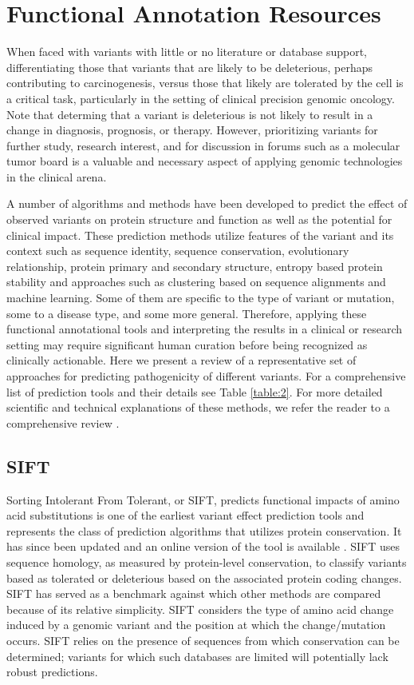 \documentclass{article}
\begin{document}
\section{Functional Annotation Resources}

When faced with variants with little or no literature or database
support, differentiating those that variants that are likely to be
deleterious, perhaps contributing to carcinogenesis, versus those that
likely are tolerated by the cell is a critical task, particularly in
the setting of clinical precision genomic oncology. Note that
determing that a variant is deleterious is not likely to result in a
change in diagnosis, prognosis, or therapy. However, prioritizing
variants for further study, research interest, and for discussion in
forums such as a molecular tumor board is a valuable and necessary
aspect of applying genomic technologies in the clinical arena.

A number of algorithms and methods have been developed to predict the
effect of observed variants on protein structure and function as well
as the potential for clinical impact. These prediction methods utilize
features of the variant and its context such as sequence identity,
sequence conservation, evolutionary relationship, protein primary and
secondary structure, entropy based protein stability and approaches
such as clustering based on sequence alignments and machine
learning. Some of them are specific to the type of variant or
mutation, some to a disease type, and some more general. Therefore,
applying these functional annotational tools and interpreting the
results in a clinical or research setting may require significant
human curation before being recognized as clinically actionable. Here
we present a review of a representative set of approaches for
predicting pathogenicity of different variants. For a comprehensive
list of prediction tools and their details see Table
\ref{table:2}. For more detailed scientific and technical explanations
of these methods, we refer the reader to a comprehensive review
\parencite{Addepalli2014-oa}.

\subsection{SIFT}

Sorting Intolerant From Tolerant, or SIFT, predicts functional impacts
of amino acid substitutions \parencite{Ng2003-vp} is one of the earliest
variant effect prediction tools and represents the class of prediction
algorithms that utilizes protein conservation. It has since been
updated and an online version of the tool is available
\parencite{Kumar2009-gd}. SIFT uses sequence homology, as measured by
protein-level conservation, to classify variants based as tolerated or
deleterious based on the associated protein coding changes. SIFT has
served as a benchmark against which other methods are compared because
of its relative simplicity. SIFT considers the type of amino acid
change induced by a genomic variant and the position at which the
change/mutation occurs. SIFT relies on the presence of sequences from
which conservation can be determined; variants for which such
databases are limited will potentially lack robust predictions.
\end{document}

